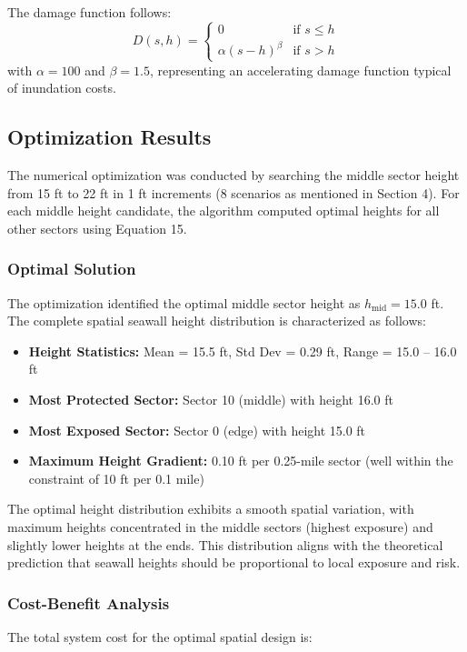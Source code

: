 \documentclass{article}
\begin{document}
The damage function follows:
\begin{equation}
D(s, h) = \begin{cases}
0 & \text{if } s \leq h \\
\alpha (s - h)^\beta & \text{if } s > h
\end{cases}
\end{equation}
with $\alpha = 100$ and $\beta = 1.5$, representing an accelerating damage function typical of inundation costs.

\subsection{Optimization Results}

The numerical optimization was conducted by searching the middle sector height from 15 ft to 22 ft in 1 ft increments (8 scenarios as mentioned in Section 4). For each middle height candidate, the algorithm computed optimal heights for all other sectors using Equation 15.

\subsubsection{Optimal Solution}
The optimization identified the optimal middle sector height as $h_{\text{mid}} = 15.0$ ft. The complete spatial seawall height distribution is characterized as follows:

\begin{itemize}
\item \textbf{Height Statistics:} Mean = 15.5 ft, Std Dev = 0.29 ft, Range = 15.0 -- 16.0 ft
\item \textbf{Most Protected Sector:} Sector 10 (middle) with height 16.0 ft
\item \textbf{Most Exposed Sector:} Sector 0 (edge) with height 15.0 ft
\item \textbf{Maximum Height Gradient:} 0.10 ft per 0.25-mile sector (well within the constraint of 10 ft per 0.1 mile)
\end{itemize}

The optimal height distribution exhibits a smooth spatial variation, with maximum heights concentrated in the middle sectors (highest exposure) and slightly lower heights at the ends. This distribution aligns with the theoretical prediction that seawall heights should be proportional to local exposure and risk.

\subsubsection{Cost-Benefit Analysis}
The total system cost for the optimal spatial design is:
\end{document}

